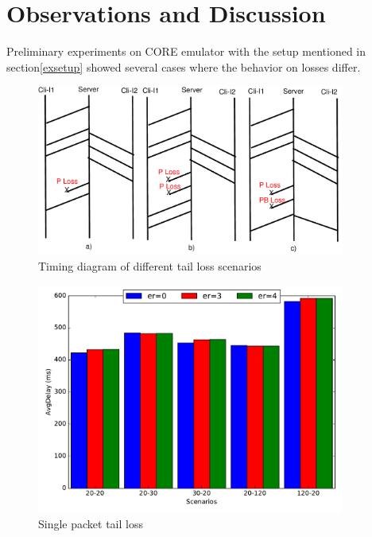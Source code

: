 \documentclass[12pt,draftcls,onecolumn]{IEEEtran}
\begin{document}
\section{Observations and Discussion}\label{disc}
Preliminary experiments on CORE emulator with the setup mentioned in section\ref{exsetup} showed several cases where the behavior on losses differ.

\begin{figure}[!ht]
\begin{center}
\includegraphics[angle=0, width=0.9\textwidth, natwidth=610, natheight=400]{images/timing.pdf}
\end{center}
\caption{Timing diagram of different tail loss scenarios}\label{timing}
\end{figure}

\begin{figure}[!ht]
\begin{center}
\includegraphics[angle=0, width=0.9\textwidth,natwidth=578.16,natheight=433.62]{plots/1P.pdf}
\caption{Single packet tail loss}\label{1p}
\end{center}
\end{figure}
\end{document}
